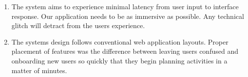 \begin{enumerate}
\begin{enumerate}
\begin{enumerate}
\item The system aims to experience minimal latency from user input to interface response. Our application needs to be as immersive as possible. Any technical glitch will detract from the user\textsc{}s experience.
\item The system\textsc{}s design follows conventional web application layouts. Proper placement of features was the difference between leaving users confused and onboarding new users so quickly that they begin planning activities in a matter of minutes.
\end{enumerate}
\end{enumerate}
\end{enumerate}